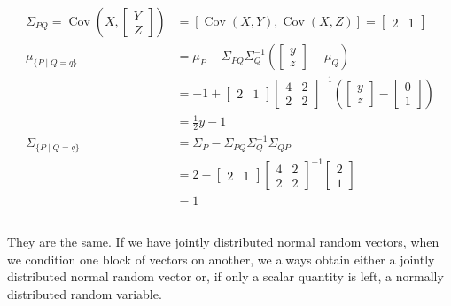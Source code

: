 \documentclass{article}
\theoremstyle{definition} %
\begin{document}
\begin{align*}
    \Sigma_{P Q}=\operatorname{Cov}\left(X,\left[\begin{array}{l}
    Y \\
    Z
    \end{array}\right]\right)&=\left[\operatorname{Cov}(X, Y), \operatorname{Cov}(X, Z)\right]=\left[\begin{array}{ll}
    2 & 1
    \end{array}\right]\\
    \mu_{\{P \mid Q=q\}}&=\mu_P+\Sigma_{P Q} \Sigma_Q^{-1}\left(\left[\begin{array}{l}
    y \\
    z
    \end{array}\right]-\mu_Q\right)\\
    &=-1+\left[\begin{array}{ll}
    2 & 1
    \end{array}\right]\left[\begin{array}{ll}
    4 & 2 \\
    2 & 2
    \end{array}\right]^{-1}\left(\left[\begin{array}{l}
    y \\
    z
    \end{array}\right]-\left[\begin{array}{l}
    0 \\
    1
    \end{array}\right]\right)\\
    &=\frac{1}{2} y-1\\
    \Sigma_{\{P\mid Q=q\}} &= \Sigma_P - \Sigma_{PQ}\Sigma_Q^{-1}\Sigma_{QP}\\
    &=2-\left[\begin{array}{ll}
    2 & 1
    \end{array}\right]\left[\begin{array}{ll}
    4 & 2 \\
    2 & 2
    \end{array}\right]^{-1}\left[\begin{array}{l}
    2 \\
    1
    \end{array}\right]\\
    &=1
\end{align*}

\subsection{}
They are the same.
If we have jointly distributed normal random vectors, when we condition one block of vectors on another, we always obtain either a jointly distributed normal random vector or, if only a scalar quantity is left, a normally distributed random variable.
\end{document}
